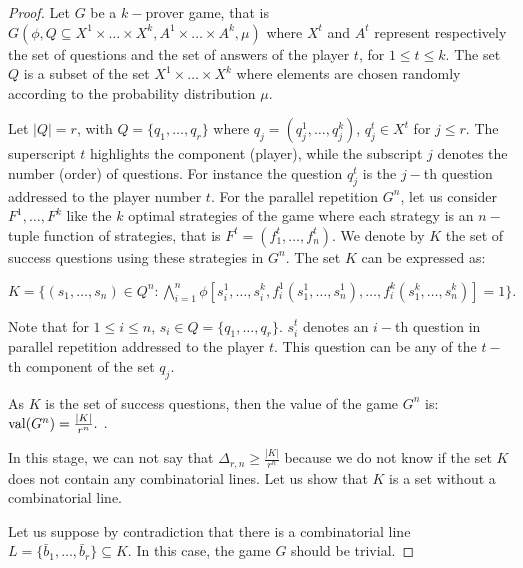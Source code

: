 \begin{proof}
  Let $G$ be a $k-$prover game, that is $G(\phi, Q\subseteq X^1 \times \ldots \times X^k, A^1 \times \ldots \times A^k, \mu)$ where $X^t$ and $A^t$ represent respectively the set of questions and the set of answers of the player $t$, for $1\leq t \leq k.$ The set $Q$ is a subset of the set $X^1 \times \ldots \times X^k$ where elements are chosen randomly  according to the probability distribution $\mu$.

 Let $|Q|=r$, with $Q=\{q_1, \ldots, q_r\}$ where $q_j=(q_j^1,\ldots, q_j^k)$, $q_j^t \in X^t$ for $j\leq r.$ The superscript  $t$ highlights the component (player), while the subscript $j$ denotes the number (order) of questions. For instance the question $q_j^t$ is the $j-$th question addressed to the player number $t.$  For the parallel repetition $G^n$, let us consider $F^1, \ldots, F^k$ like the $k$ optimal strategies of the game where each strategy is an $n-$tuple function of strategies, that is $F^t=(f_1^t,\ldots, f_n^t)$. We denote by $K$ the set of success questions using these strategies in $G^n.$ The set $K$ can be expressed as: 
 
 $K=\{(s_1, \ldots, s_n) \in Q^n: \bigwedge\limits_{i=1}^n \phi \left[ s_i^1, \ldots, s_i^k, f_i^1(s_1^1, \ldots, s_n^1), \ldots, f_i^k(s_1^k, \ldots, s_n^k) \right]=1 \}.$

Note that for $1\leq i \leq n$,  $s_i \in Q=\{q_1, \ldots, q_r\}.$ $s_i^t$ denotes an $i-$th question in parallel repetition addressed to the player $t$. This question can be any of the $t-$th component of the set  $q_j.$
 
As $K$ is the set of success questions, then the value of the game $G^n$ is: $\mathrm{val} (G^n) = \frac{|K|}{r^n}.$
.
 
In this stage, we can not say that $\Delta_{r,n} \geq \frac{|K|}{r^n}$
because we do not know if the set  $K$ does not contain any combinatorial lines. Let us show that $K$ is a set without a combinatorial line.

Let us suppose by contradiction that there is a combinatorial line $L=\{\bar{b}_1, \ldots, \bar{b}_r \} \subseteq K.$ In this case,  the game  $G$ should be trivial.
 

\end{proof}
